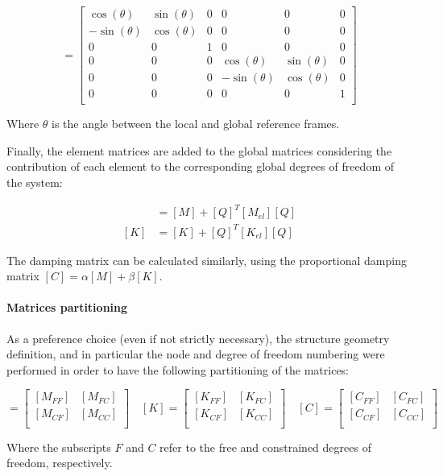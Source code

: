 \begin{equation}
    [Q] = \begin{bmatrix}
        \cos(\theta)  & \sin(\theta) & 0 & 0             & 0            & 0 \\
        -\sin(\theta) & \cos(\theta) & 0 & 0             & 0            & 0 \\
        0             & 0            & 1 & 0             & 0            & 0 \\
        0             & 0            & 0 & \cos(\theta)  & \sin(\theta) & 0 \\
        0             & 0            & 0 & -\sin(\theta) & \cos(\theta) & 0 \\
        0             & 0            & 0 & 0             & 0            & 1 \\
    \end{bmatrix}
\end{equation}

Where $\theta$ is the angle between the local and global reference frames.

Finally, the element matrices are added to the global matrices considering the contribution of each element to the corresponding global degrees of freedom of the system:

\begin{align}
    [M] & = [M] + [Q]^T [M_{el}] [Q] \\
    [K] & = [K] + [Q]^T [K_{el}] [Q]
\end{align}

The damping matrix can be calculated similarly, using the proportional damping matrix $[C] = \alpha [M] + \beta [K]$.

\paragraph{Matrices partitioning}

As a preference choice (even if not strictly necessary), the structure geometry definition, and in particular the node and degree of freedom numbering were performed in order to have the following partitioning of the matrices:

\begin{equation}
    [M] = \begin{bmatrix}
        [M_{FF}] & [M_{FC}] \\
        [M_{CF}] & [M_{CC}] \\
    \end{bmatrix}
    \quad
    [K] = \begin{bmatrix}
        [K_{FF}] & [K_{FC}] \\
        [K_{CF}] & [K_{CC}] \\
    \end{bmatrix}
    \quad
    [C] = \begin{bmatrix}
        [C_{FF}] & [C_{FC}] \\
        [C_{CF}] & [C_{CC}] \\
    \end{bmatrix}
\end{equation}

Where the subscripts $F$ and $C$ refer to the free and constrained degrees of freedom, respectively.
